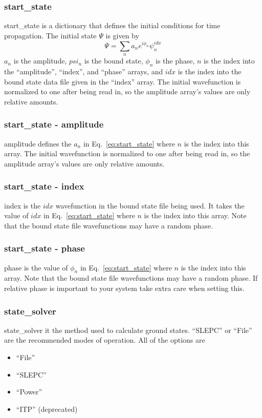 \documentclass{article}
\begin{document}
\subsubsection{start\_state}
start\_state is a dictionary that defines the initial conditions for time propagation. The initial state $\Psi$ is given by
\begin{equation}
  \Psi = \sum\limits_n a_n e^{i\phi_n} \psi_n^{idx}
  \label{eq:start_state}
\end{equation}
$a_n$ is the amplitude, $psi_n$ is the bound state, $\phi_n$ is the phase, $n$ is the index into the ``amplitude'', ``index'', and ``phase'' arrays, and $idx$ is the index into the bound state data file given in the ``index'' array. The initial wavefunction is normalized to one after being read in, so the amplitude array's values are only relative amounts.

\subsubsection{start\_state - amplitude}
amplitude defines the $a_n$ in Eq.~\ref{eq:start_state} where $n$ is the index into this array. The initial wavefunction is normalized to one after being read in, so the amplitude array's values are only relative amounts.

\subsubsection{start\_state - index}
index is the $idx$ wavefunction in the bound state file being used. It takes the value of $idx$ in Eq.~\ref{eq:start_state} where $n$ is the index into this array. Note that the bound state file wavefunctions may have a random phase.

\subsubsection{start\_state - phase}
phase is the value of $\phi_n$ in Eq.~\ref{eq:start_state} where $n$ is the index into this array. Note that the bound state file wavefunctions may have a random phase. If relative phase is important to your system take extra care when setting this.

\subsubsection{state\_solver}
state\_solver it the method used to calculate ground states. ``SLEPC'' or ``File'' are the recommended modes of operation. All of the options are
\begin{itemize}
  \item ``File''
  \item ``SLEPC''
  \item ``Power''
  \item ``ITP'' (deprecated)
\end{itemize}
\end{document}

